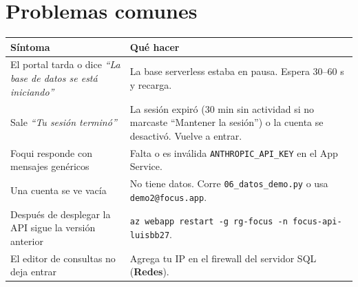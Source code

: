 \documentclass[11pt,a4paper]{article}
\newcommand{\menu}[1]{\textsf{\textbf{#1}}}
\begin{document}
\section{Problemas comunes}
\begin{center}
\renewcommand{\arraystretch}{1.25}
\begin{tabularx}{\textwidth}{>{\raggedright\arraybackslash}p{5.2cm} X}
\toprule
Síntoma & Qué hacer \\
\midrule
El portal tarda o dice \emph{``La base de datos se está iniciando''} & La base serverless estaba en pausa. Espera 30--60 s y recarga. \\
Sale \emph{``Tu sesión terminó''} & La sesión expiró (30 min sin actividad si no marcaste ``Mantener la sesión'') o la cuenta se desactivó. Vuelve a entrar. \\
Foqui responde con mensajes genéricos & Falta o es inválida \texttt{ANTHROPIC\_API\_KEY} en el App Service. \\
Una cuenta se ve vacía & No tiene datos. Corre \texttt{06\_datos\_demo.py} o usa \texttt{demo2@focus.app}. \\
Después de desplegar la API sigue la versión anterior & \texttt{az webapp restart -g rg-focus -n focus-api-luisbb27}. \\
El editor de consultas no deja entrar & Agrega tu IP en el firewall del servidor SQL (\menu{Redes}). \\
\bottomrule
\end{tabularx}
\end{center}
\end{document}
